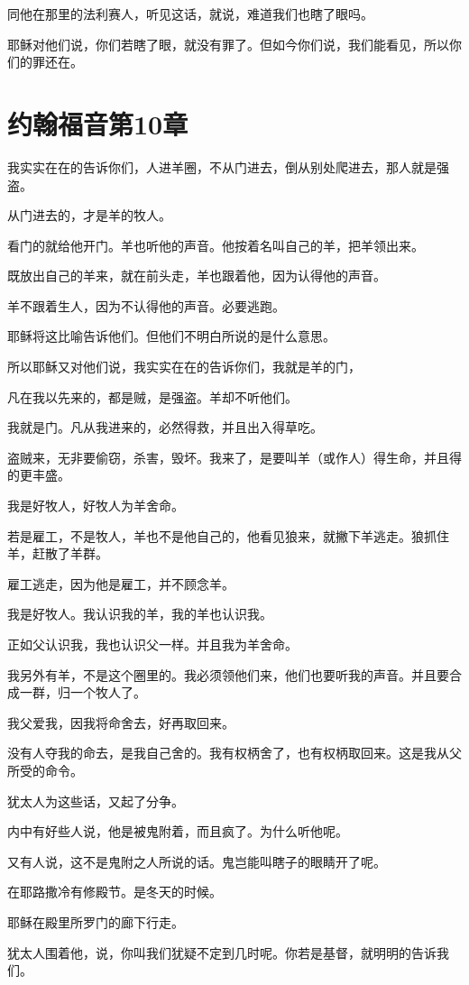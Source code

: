 \documentclass[12pt,oneside]{book}
\begin{document}
同他在那里的法利赛人，听见这话，就说，难道我们也瞎了眼吗。

耶稣对他们说，你们若瞎了眼，就没有罪了。但如今你们说，我们能看见，所以你们的罪还在。

\chapter{约翰福音第10章}
我实实在在的告诉你们，人进羊圈，不从门进去，倒从别处爬进去，那人就是强盗。

从门进去的，才是羊的牧人。

看门的就给他开门。羊也听他的声音。他按着名叫自己的羊，把羊领出来。

既放出自己的羊来，就在前头走，羊也跟着他，因为认得他的声音。

羊不跟着生人，因为不认得他的声音。必要逃跑。

耶稣将这比喻告诉他们。但他们不明白所说的是什么意思。

所以耶稣又对他们说，我实实在在的告诉你们，我就是羊的门，

凡在我以先来的，都是贼，是强盗。羊却不听他们。

我就是门。凡从我进来的，必然得救，并且出入得草吃。

盗贼来，无非要偷窃，杀害，毁坏。我来了，是要叫羊（或作人）得生命，并且得的更丰盛。

我是好牧人，好牧人为羊舍命。

若是雇工，不是牧人，羊也不是他自己的，他看见狼来，就撇下羊逃走。狼抓住羊，赶散了羊群。

雇工逃走，因为他是雇工，并不顾念羊。

我是好牧人。我认识我的羊，我的羊也认识我。

正如父认识我，我也认识父一样。并且我为羊舍命。

我另外有羊，不是这个圈里的。我必须领他们来，他们也要听我的声音。并且要合成一群，归一个牧人了。

我父爱我，因我将命舍去，好再取回来。

没有人夺我的命去，是我自己舍的。我有权柄舍了，也有权柄取回来。这是我从父所受的命令。

犹太人为这些话，又起了分争。

内中有好些人说，他是被鬼附着，而且疯了。为什么听他呢。

又有人说，这不是鬼附之人所说的话。鬼岂能叫瞎子的眼睛开了呢。

在耶路撒冷有修殿节。是冬天的时候。

耶稣在殿里所罗门的廊下行走。

犹太人围着他，说，你叫我们犹疑不定到几时呢。你若是基督，就明明的告诉我们。
\end{document}
